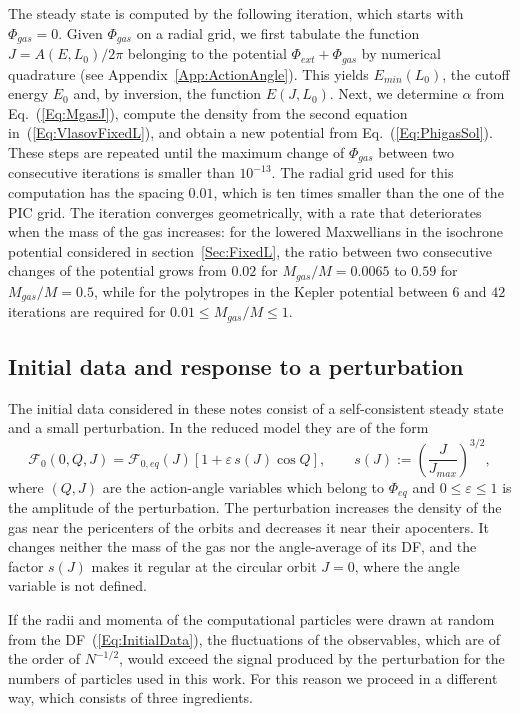 The steady state is computed by the following iteration, which starts with $\Phi_{gas} = 0$. Given $\Phi_{gas}$ on a radial grid, we first tabulate the function $J = A(E,L_0)/2\pi$ belonging to the potential $\Phi_{ext} + \Phi_{gas}$ by numerical quadrature (see Appendix~\ref{App:ActionAngle}). This yields $E_{min}(L_0)$, the cutoff energy $E_0$ and, by inversion, the function $E(J,L_0)$. Next, we determine $\alpha$ from Eq.~(\ref{Eq:MgasJ}), compute the density from the second equation in~(\ref{Eq:VlasovFixedL}), and obtain a new potential from Eq.~(\ref{Eq:PhigasSol}). These steps are repeated until the maximum change of $\Phi_{gas}$ between two consecutive iterations is smaller than $10^{-13}$. The radial grid used for this computation has the spacing $0.01$, which is ten times smaller than the one of the PIC grid. The iteration converges geometrically, with a rate that deteriorates when the mass of the gas increases: for the lowered Maxwellians in the isochrone potential considered in section~\ref{Sec:FixedL}, the ratio between two consecutive changes of the potential grows from $0.02$ for $M_{gas}/M = 0.0065$ to $0.59$ for $M_{gas}/M = 0.5$, while for the polytropes in the Kepler potential between $6$ and $42$ iterations are required for $0.01\leq M_{gas}/M\leq 1$.


\subsection{Initial data and response to a perturbation}
\label{SubSec:QuietStart}

The initial data considered in these notes consist of a self-consistent steady state and a small perturbation. In the reduced model they are of the form
\begin{equation}
\mathcal{F}_0(0,Q,J) = \mathcal{F}_{0,eq}(J)\left[ 1 + \varepsilon\, s(J)\cos Q \right],\qquad
s(J) := \left( \frac{J}{J_{max}} \right)^{3/2},
\label{Eq:InitialData}
\end{equation}
where $(Q,J)$ are the action-angle variables which belong to $\Phi_{eq}$ and $0\leq \varepsilon\leq 1$ is the amplitude of the perturbation. The perturbation increases the density of the gas near the pericenters of the orbits and decreases it near their apocenters. It changes neither the mass of the gas nor the angle-average of its DF, and the factor $s(J)$ makes it regular at the circular orbit $J = 0$, where the angle variable is not defined.

If the radii and momenta of the computational particles were drawn at random from the DF~(\ref{Eq:InitialData}), the fluctuations of the observables, which are of the order of $N^{-1/2}$, would exceed the signal produced by the perturbation for the numbers of particles used in this work. For this reason we proceed in a different way, which consists of three ingredients.

